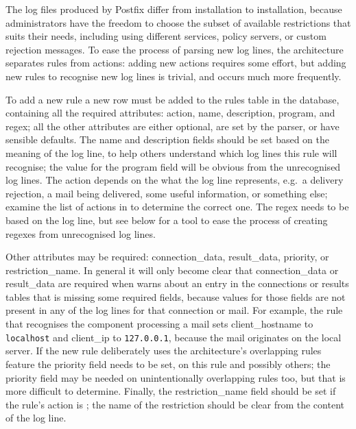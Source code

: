 The log files produced by Postfix differ from installation to installation,
because administrators have the freedom to choose the subset of available
restrictions that suits their needs, including using different
 services, policy servers, or custom rejection messages.  To
ease the process of parsing new log lines, the architecture separates rules
from actions: adding new actions requires some effort, but adding new rules
to recognise new log lines is trivial, and occurs much more frequently.

To add a new rule a new row must be added to the rules table in the
database, containing all the required attributes: action, name,
description, program, and regex; all the other attributes are either
optional, are set by the parser, or have sensible defaults.  The name and
description fields should be set based on the meaning of the log line, to
help others understand which log lines this rule will recognise; the value
for the program field will be obvious from the unrecognised log lines.  The
action depends on the what the log line represents, e.g.\ a delivery
rejection, a mail being delivered, some useful information, or something
else; examine the list of actions in  to determine the correct one.  The regex needs to be based
on the log line, but see below for a tool to ease the process of creating
regexes from unrecognised log lines.

Other attributes may be required: connection\_data, result\_data, priority,
or restriction\_name.  In general it will only become clear that
connection\_data or result\_data are required when \parsername{} warns
about an entry in the connections or results tables that is missing some
required fields, because values for those fields are not present in any of
the log lines for that connection or mail.  For example, the rule that
recognises the  component processing a mail sets
client\_hostname to \texttt{localhost} and client\_ip to
\texttt{127.0.0.1}, because the mail originates on the local server.  If
the new rule deliberately uses the architecture's overlapping rules feature
the priority field needs to be set, on this rule and possibly others; the
priority field may be needed on unintentionally overlapping rules too, but
that is more difficult to determine.  Finally, the restriction\_name field
should be set if the rule's action is ; the name
of the restriction should be clear from the content of the log line.

